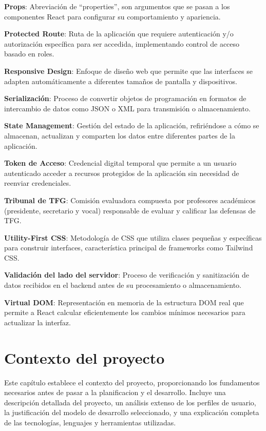 \documentclass[12pt,a4paper,oneside]{report}
\begin{document}
\textbf{Props}: Abreviación de ``properties'', son argumentos que se
pasan a los componentes React para configurar su comportamiento y
apariencia.

\textbf{Protected Route}: Ruta de la aplicación que requiere
autenticación y/o autorización específica para ser accedida,
implementando control de acceso basado en roles.

\textbf{Responsive Design}: Enfoque de diseño web que permite que las
interfaces se adapten automáticamente a diferentes tamaños de pantalla y
dispositivos.

\textbf{Serialización}: Proceso de convertir objetos de programación en
formatos de intercambio de datos como JSON o XML para transmisión o
almacenamiento.

\textbf{State Management}: Gestión del estado de la aplicación,
refiriéndose a cómo se almacenan, actualizan y comparten los datos entre
diferentes partes de la aplicación.

\textbf{Token de Acceso}: Credencial digital temporal que permite a un
usuario autenticado acceder a recursos protegidos de la aplicación sin
necesidad de reenviar credenciales.

\textbf{Tribunal de TFG}: Comisión evaluadora compuesta por profesores
académicos (presidente, secretario y vocal) responsable de evaluar y
calificar las defensas de TFG.

\textbf{Utility-First CSS}: Metodología de CSS que utiliza clases
pequeñas y específicas para construir interfaces, característica
principal de frameworks como Tailwind CSS.

\textbf{Validación del lado del servidor}: Proceso de verificación y
sanitización de datos recibidos en el backend antes de su procesamiento
o almacenamiento.

\textbf{Virtual DOM}: Representación en memoria de la estructura DOM
real que permite a React calcular eficientemente los cambios mínimos
necesarios para actualizar la interfaz.

\chapter{Contexto del proyecto}\label{contexto-del-proyecto}

Este capítulo establece el contexto del proyecto, proporcionando los fundamentos necesarios antes de pasar a la planificacion y el desarrollo. Incluye una descripción detallada del proyecto, un análisis extenso de los perfiles de usuario, la justificación del modelo de desarrollo seleccionado, y una explicación completa de las tecnologías, lenguajes y herramientas utilizadas.
\end{document}
